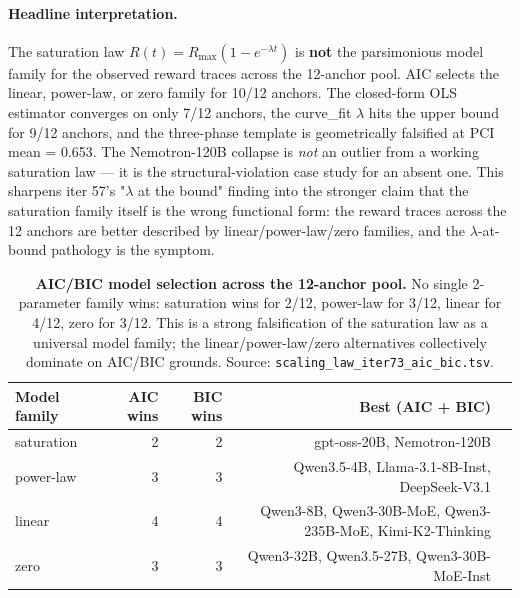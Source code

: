 \paragraph{Headline interpretation.}
The saturation law $R(t) = R_\mathrm{max} (1 - e^{-\lambda t})$
is \textbf{not} the parsimonious model family for the
observed reward traces across the 12-anchor pool.  AIC
selects the linear, power-law, or zero family for 10/12
anchors.  The closed-form OLS estimator converges on only 7/12
anchors, the curve\_fit $\lambda$ hits the upper bound for 9/12
anchors, and the three-phase template is geometrically
falsified at PCI mean = 0.653.  The Nemotron-120B collapse is
\emph{not} an outlier from a working saturation law --- it is
the structural-violation case study for an absent one.  This
sharpens iter 57's "$\lambda$ at the bound" finding into the
stronger claim that the saturation family itself is the wrong
functional form: the reward traces across the 12 anchors are
better described by linear/power-law/zero families, and the
$\lambda$-at-bound pathology is the symptom.

\begin{table}[t]
  \centering
  \small
  \begin{tabular}{lrrrr}
    \toprule
    Model family & AIC wins & BIC wins & Best (AIC + BIC) \\
    \midrule
      saturation  & 2 & 2 & gpt-oss-20B, Nemotron-120B \\
      power-law   & 3 & 3 & Qwen3.5-4B, Llama-3.1-8B-Inst, DeepSeek-V3.1 \\
      linear      & 4 & 4 & Qwen3-8B, Qwen3-30B-MoE, Qwen3-235B-MoE, Kimi-K2-Thinking \\
      zero        & 3 & 3 & Qwen3-32B, Qwen3.5-27B, Qwen3-30B-MoE-Inst \\
    \bottomrule
  \end{tabular}
  \caption{\textbf{AIC/BIC model selection across the 12-anchor pool.}
    No single 2-parameter family wins: saturation wins for 2/12,
    power-law for 3/12, linear for 4/12, zero for 3/12.  This is
    a strong falsification of the saturation law as a universal
    model family; the linear/power-law/zero alternatives
    collectively dominate on AIC/BIC grounds.  Source:
    \texttt{scaling\_law\_iter73\_aic\_bic.tsv}.}
  \label{tab:iter73-aic}
\end{table}

